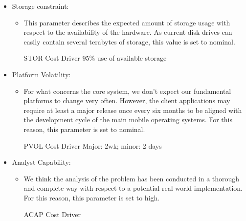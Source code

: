 \begin{itemize}
	\item Storage constraint: 
	\begin{itemize}
	\item[] This parameter describes the expected amount of storage usage with respect to the availability of the hardware. As current disk drives can easily contain several terabytes of storage, this value is set to nominal.
	\begin{costdriverstable}{STOR Cost Driver}
		 {95\% use of available storage}\hline
	\end{costdriverstable}
	\end{itemize}
\end{itemize}

\begin{itemize}
	\item Platform Volatility: 
	\begin{itemize}
	\item[] For what concerns the core system, we don't expect our fundamental platforms to change very often. However, the client applications may require at least a major release once every six months to be aligned with the development cycle of the main mobile operating systems. For this reason, this parameter is set to nominal.
	\pagebreak
	\begin{costdriverstable}{PVOL Cost Driver}
			{Major: 2wk; minor: 2 days}{}\hline
	\end{costdriverstable}
	\end{itemize}
\end{itemize}

\begin{itemize}
	\item Analyst Capability: 
	\begin{itemize}
	\item[] We think the analysis of the problem has been conducted in a thorough and complete way with respect to a potential real world implementation. For this reason, this parameter is set to high.
	\begin{costdriverstable}{ACAP Cost Driver}
		\hline
	\end{costdriverstable}
	\end{itemize}
\end{itemize}

